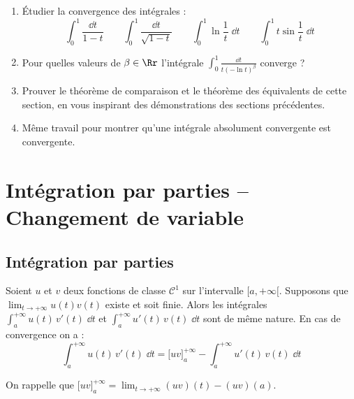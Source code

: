 \documentclass[class=report,crop=false]{standalone}
\begin{document}
\begin{miniexercices}
\begin{enumerate}
  \item \'Etudier la convergence des intégrales :
  $$\int_0^1 \frac{\dd t}{1-t} \qquad 
  \int_0^1 \frac{\dd t}{\sqrt{1-t}} \qquad 
  \int_0^1 \ln \frac1t \;\dd t \qquad
  \int_0^1 t\sin \frac1t \;\dd t$$
  
  \item Pour quelles valeurs de $\beta \in \Rr$ l'intégrale
  $\int_0^1 \frac{\dd t}{t(-\ln t)^\beta}$ converge ?
  
  \item Prouver le théorème de comparaison et le théorème des équivalents de cette section, 
  en vous inspirant des démonstrations des sections précédentes.
 
  \item Même travail pour montrer qu'une intégrale absolument convergente est convergente.

\end{enumerate}
\end{miniexercices}




\section{Intégration par parties -- Changement de variable}

\subsection{Intégration par parties}



\begin{theoreme}
Soient $u$ et $v$ deux fonctions de classe $\mathcal{C}^1$ sur l'intervalle $[a,+\infty[$.
Supposons que $\lim_{t\to+\infty} u(t)v(t)$ existe et soit finie.
Alors les intégrales $\displaystyle\int_a^{+\infty} u(t) \, v'(t)\;\dd t$
et $\displaystyle\int_a^{+\infty} u'(t) \, v(t)\;\dd t$ sont de même nature.
En cas de convergence on a :
$$\int_a^{+\infty} u(t) \, v'(t)\;\dd t 
= \big[uv\big]_a^{+\infty} - \int_a^{+\infty} u'(t) \, v(t)\;\dd t$$
\end{theoreme}

On rappelle que $\big[uv\big]_a^{+\infty} = \lim_{t\to+\infty} (uv)(t) - (uv)(a)$.
\end{document}
